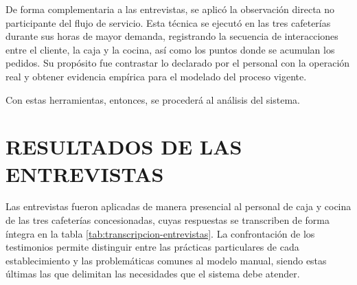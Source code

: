 De forma complementaria a las entrevistas, se aplicó la observación directa no participante del flujo de servicio. Esta técnica se ejecutó en las tres cafeterías durante sus horas de mayor demanda, registrando la secuencia de interacciones entre el cliente, la caja y la cocina, así como los puntos donde se acumulan los pedidos. Su propósito fue contrastar lo declarado por el personal con la operación real y obtener evidencia empírica para el modelado del proceso vigente.

Con estas herramientas, entonces, se procederá al análisis del sistema.

\section{RESULTADOS DE LAS ENTREVISTAS}
Las entrevistas fueron aplicadas de manera presencial al personal de caja y cocina de las tres cafeterías concesionadas, cuyas respuestas se transcriben de forma íntegra en la tabla \ref{tab:transcripcion-entrevistas}. La confrontación de los testimonios permite distinguir entre las prácticas particulares de cada establecimiento y las problemáticas comunes al modelo manual, siendo estas últimas las que delimitan las necesidades que el sistema debe atender.

\begingroup
\setlength{\LTleft}{\fill}
\setlength{\LTright}{\fill}

